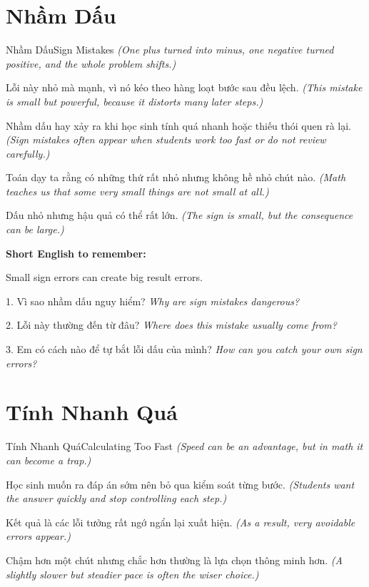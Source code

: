 \section{Nhầm Dấu}
\begin{truyen}{Nhầm Dấu}{Sign Mistakes}
\textit{(One plus turned into minus, one negative turned positive, and the whole problem shifts.)}

Lỗi này nhỏ mà mạnh, vì nó kéo theo hàng loạt bước sau đều lệch.
\textit{(This mistake is small but powerful, because it distorts many later steps.)}

Nhầm dấu hay xảy ra khi học sinh tính quá nhanh hoặc thiếu thói quen rà lại.
\textit{(Sign mistakes often appear when students work too fast or do not review carefully.)}

Toán dạy ta rằng có những thứ rất nhỏ nhưng không hề nhỏ chút nào.
\textit{(Math teaches us that some very small things are not small at all.)}
\end{truyen}

\begin{baihoc}
Dấu nhỏ nhưng hậu quả có thể rất lớn.
\textit{(The sign is small, but the consequence can be large.)}
\end{baihoc}

\begin{ghinhoanh}
\textbf{Short English to remember:}

Small sign errors can create big result errors.

\end{ghinhoanh}

\begin{tuhocnhanh}
1. Vì sao nhầm dấu nguy hiểm? \textit{Why are sign mistakes dangerous?}

2. Lỗi này thường đến từ đâu? \textit{Where does this mistake usually come from?}

3. Em có cách nào để tự bắt lỗi dấu của mình? \textit{How can you catch your own sign errors?}
\end{tuhocnhanh}
\ngancach

\section{Tính Nhanh Quá}
\begin{truyen}{Tính Nhanh Quá}{Calculating Too Fast}
\textit{(Speed can be an advantage, but in math it can become a trap.)}

Học sinh muốn ra đáp án sớm nên bỏ qua kiểm soát từng bước.
\textit{(Students want the answer quickly and stop controlling each step.)}

Kết quả là các lỗi tưởng rất ngớ ngẩn lại xuất hiện.
\textit{(As a result, very avoidable errors appear.)}

Chậm hơn một chút nhưng chắc hơn thường là lựa chọn thông minh hơn.
\textit{(A slightly slower but steadier pace is often the wiser choice.)}
\end{truyen}

